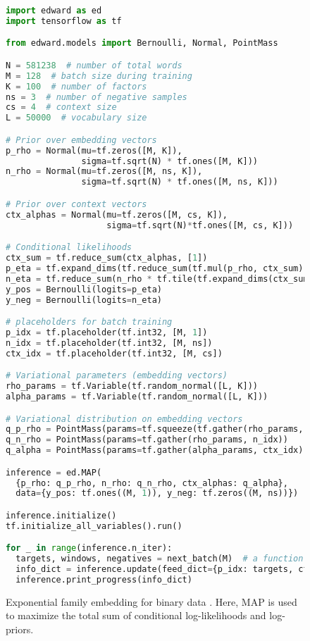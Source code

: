 \begin{figure}[!h]
\begin{lstlisting}[language=python]
import edward as ed
import tensorflow as tf

from edward.models import Bernoulli, Normal, PointMass

N = 581238  # number of total words
M = 128  # batch size during training
K = 100  # number of factors
ns = 3  # number of negative samples
cs = 4  # context size
L = 50000  # vocabulary size

# Prior over embedding vectors
p_rho = Normal(mu=tf.zeros([M, K]),
               sigma=tf.sqrt(N) * tf.ones([M, K]))
n_rho = Normal(mu=tf.zeros([M, ns, K]),
               sigma=tf.sqrt(N) * tf.ones([M, ns, K]))

# Prior over context vectors
ctx_alphas = Normal(mu=tf.zeros([M, cs, K]),
                    sigma=tf.sqrt(N)*tf.ones([M, cs, K]))

# Conditional likelihoods
ctx_sum = tf.reduce_sum(ctx_alphas, [1])
p_eta = tf.expand_dims(tf.reduce_sum(tf.mul(p_rho, ctx_sum), -1),1)
n_eta = tf.reduce_sum(n_rho * tf.tile(tf.expand_dims(ctx_sum, 1), [1, ns, 1]), -1)
y_pos = Bernoulli(logits=p_eta)
y_neg = Bernoulli(logits=n_eta)

# placeholders for batch training
p_idx = tf.placeholder(tf.int32, [M, 1])
n_idx = tf.placeholder(tf.int32, [M, ns])
ctx_idx = tf.placeholder(tf.int32, [M, cs])

# Variational parameters (embedding vectors)
rho_params = tf.Variable(tf.random_normal([L, K]))
alpha_params = tf.Variable(tf.random_normal([L, K]))

# Variational distribution on embedding vectors
q_p_rho = PointMass(params=tf.squeeze(tf.gather(rho_params, p_idx)))
q_n_rho = PointMass(params=tf.gather(rho_params, n_idx))
q_alpha = PointMass(params=tf.gather(alpha_params, ctx_idx))

inference = ed.MAP(
  {p_rho: q_p_rho, n_rho: q_n_rho, ctx_alphas: q_alpha},
  data={y_pos: tf.ones((M, 1)), y_neg: tf.zeros((M, ns))})

inference.initialize()
tf.initialize_all_variables().run()

for _ in range(inference.n_iter):
  targets, windows, negatives = next_batch(M)  # a function to generate data
  info_dict = inference.update(feed_dict={p_idx: targets, ctx_idx: windows, n_idx: negatives})
  inference.print_progress(info_dict)
\end{lstlisting}
\caption{Exponential family embedding for binary data \citep{rudolph2016exponential}. Here, \gls{MAP}
is used to maximize the total sum of conditional log-likelihoods and log-priors.}
\label{fig:ef_emb}
\end{figure}

